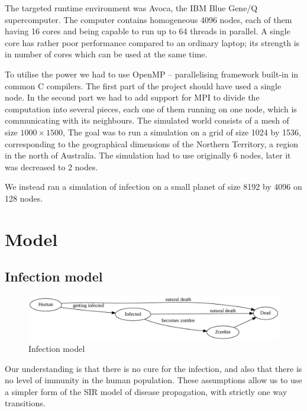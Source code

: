 \documentclass[a4paper]{article}
\begin{document}
The targeted runtime environment was Avoca\cite{avoca}, the IBM Blue Gene/Q\cite{bluegeneq} supercomputer.
The computer contains homogeneous 4096 nodes, each of them having 16 cores and being capable to run up to 64 threads in parallel.
A single core has rather poor performance compared to an ordinary laptop; its strength is in number of cores which can be used at the same time.

To utilise the power we had to use OpenMP\cite{openmp} -- parallelising framework built-in in common C compilers.
The first part of the project should have used a single node.
In the second part we had to add support for MPI\cite{mpi} to divide the computation into several pieces, each one of them running on one node, which is communicating with its neighbours.
The simulated world consists of a mesh of size $1000 \times 1500$, 
The goal was to run a simulation on a grid of size 1024 by 1536, corresponding to the geographical dimensions of the Northern Territory, a region in the north of Australia\cite{northernterritory}.
The simulation had to use originally 6 nodes, later it was decreased to 2 nodes.

We instead ran a simulation of infection on a small planet of size 8192 by 4096 on 128 nodes.

\section{Model}

\subsection{Infection model}

\begin{figure}[ht]
        \centering
        \includegraphics[width=\textwidth]{model}
        \caption{Infection model}
\end{figure}

Our understanding is that there is no cure for the infection, and also that there is no level of immunity in the human population.
These assumptions allow us to use a simpler form of the SIR model of disease propagation, with strictly one way transitions.
\end{document}
